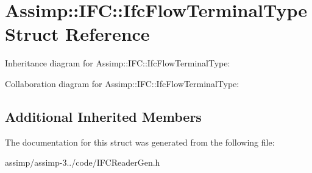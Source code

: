 \hypertarget{struct_assimp_1_1_i_f_c_1_1_ifc_flow_terminal_type}{\section{Assimp\+:\+:I\+F\+C\+:\+:Ifc\+Flow\+Terminal\+Type Struct Reference}
\label{struct_assimp_1_1_i_f_c_1_1_ifc_flow_terminal_type}
}


Inheritance diagram for Assimp\+:\+:I\+F\+C\+:\+:Ifc\+Flow\+Terminal\+Type\+:


Collaboration diagram for Assimp\+:\+:I\+F\+C\+:\+:Ifc\+Flow\+Terminal\+Type\+:
\subsection*{Additional Inherited Members}


The documentation for this struct was generated from the following file\+:\begin{DoxyCompactItemize}
\item 
assimp/assimp-\/3../code/I\+F\+C\+Reader\+Gen.\+h\end{DoxyCompactItemize}
